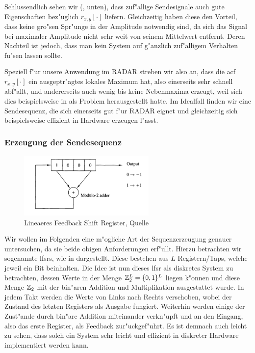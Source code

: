 Schlussendlich sehen wir (, unten), dass zuf"allige Sendesignale auch gute Eigenschaften bez"uglich $r_{x,y}[\cdot]$ liefern.
Gleichzeitig haben diese den Vorteil, dass keine gro"sen Spr"unge in der Amplitude notwendig sind, da sich das Signal bei maximaler Amplitude nicht sehr weit von seinem Mittelwert entfernt.
Deren Nachteil ist jedoch, dass man kein System auf g"anzlich zuf"alligem Verhalten fu"sen lassen sollte.

Speziell f"ur unsere Anwendung im RADAR streben wir also an, dass die \gls{acf} $r_{x,y}[\cdot]$ ein ausgeptr"agtes lokales Maximum hat, also einerseits sehr schnell abf"allt, und andererseits auch wenig bis keine Nebenmaxima erzeugt, weil sich dies beispielsweise in  als Problem herausgestellt hatte.
Im Idealfall finden wir eine Sendesequenz, die sich einerseits gut f"ur RADAR eignet und gleichzeitig sich beispielsweise effizient in Hardware erzeugen l"asst.

\FloatBarrier
\subsubsection{Erzeugung der Sendesequenz}
%
\begin{figure}
    \begin{center}
        \includegraphics[width=0.6\textwidth]{img/lfsr_1.png}
    \end{center}
    \caption{Lineaeres Feedback Shift Register, Quelle \cite{proakis2013}}\label{fig:mseq:lfsr}
\end{figure}
%
Wir wollen im Folgenden eine m"ogliche Art der Sequenzerzeugung genauer untersuchen, da sie beide obigen Anforderungen erf"ullt.
Hierzu betrachten wir sogenannte \glspl{lfsr}, wie in  dargestellt.
Diese bestehen aus $L$ Registern/Taps, welche jeweil ein Bit beinhalten.
Die Idee ist nun dieses \gls{lfsr} als diskretes System zu betrachten, dessen Werte in der Menge $\mathbb{Z}_2^L = \{0,1\}^L$ liegen k"onnen und diese Menge $\mathbb{Z}_2$ mit der bin"aren Addition und Multiplikation ausgestattet wurde.
In jedem Takt werden die Werte von Links nach Rechts verschoben, wobei der Zustand des letzten Registers als Ausgabe fungiert.
Weiterhin werden einige der Zust"ande durch bin"are Addition miteinander verkn"upft und an den Eingang, also das erste Register, als Feedback zur"uckgef"uhrt.
Es ist demnach auch leicht zu sehen, dass solch ein System sehr leicht und effizient in diskreter Hardware implementiert werden kann.

